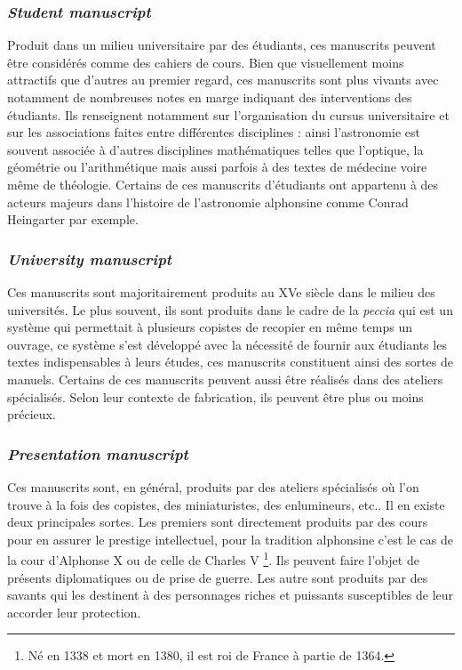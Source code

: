 	\subsubsection{\textit{Student manuscript}}
	Produit dans un milieu universitaire par des étudiants, ces manuscrits peuvent être considérés comme des cahiers de cours. Bien que visuellement moins attractifs que d'autres au premier regard, ces manuscrits sont plus vivants avec notamment de nombreuses notes en marge indiquant des interventions des étudiants. Ils renseignent notamment sur l'organisation du cursus universitaire et sur les associations faites entre différentes disciplines : ainsi l'astronomie est souvent associée à d’autres disciplines mathématiques telles que l'optique, la géométrie ou l'arithmétique mais aussi parfois à des textes de médecine voire même de théologie. Certains de ces manuscrits d’étudiants ont appartenu à des acteurs majeurs dans l’histoire de l’astronomie alphonsine comme Conrad Heingarter par exemple.

	\subsubsection{\textit{University manuscript}}
	Ces manuscrits sont majoritairement produits au XVe siècle dans le milieu des universités. Le plus souvent, ils sont produits dans le cadre de la \textit{peccia} qui est un système qui permettait à plusieurs copistes de recopier en même temps un ouvrage, ce système s'est développé avec la nécessité de fournir aux étudiants les textes indispensables à leurs études, ces manuscrits constituent ainsi des sortes de manuels. Certains de ces manuscrits peuvent aussi être réalisés dans des ateliers spécialisés. Selon leur contexte de fabrication, ils peuvent être plus ou moins précieux. 

	\subsubsection{\textit{Presentation manuscript}}
	Ces manuscrits sont, en général, produits par des ateliers spécialisés où l'on trouve à la fois des copistes, des miniaturistes, des enlumineurs, etc.. Il en existe deux principales sortes. Les premiers sont directement produits par des cours pour en assurer le prestige intellectuel, pour la tradition alphonsine c'est le cas de la cour d'Alphonse X ou de celle de Charles V \footnote{Né en 1338 et mort en 1380, il est roi de France à partie de 1364.}. Ils peuvent faire l'objet de présents diplomatiques ou de prise de guerre. Les autre sont produits par des savants qui les destinent à des personnages riches et puissants susceptibles de leur accorder leur protection. 

